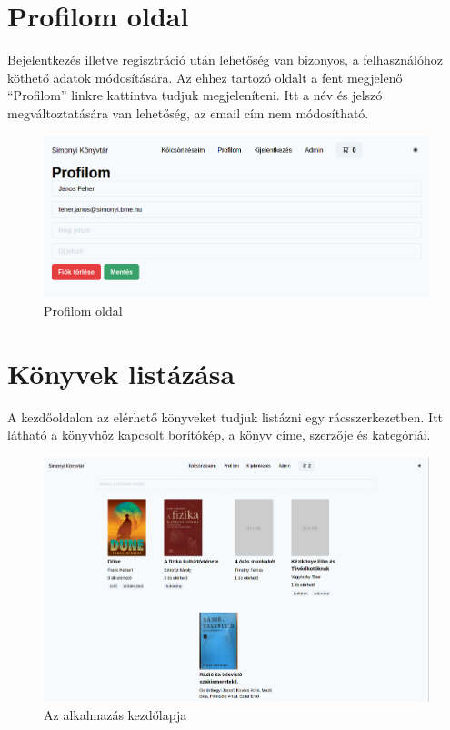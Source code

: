 \section{Profilom oldal}

Bejelentkezés illetve regisztráció után lehetőség van bizonyos, a felhasználóhoz köthető adatok módosítására. Az ehhez tartozó oldalt a fent megjelenő ``Profilom''
linkre kattintva tudjuk megjeleníteni. Itt a név és jelszó megváltoztatására van lehetőség, az email cím nem módosítható.

\begin{figure}[!ht]
  \centering
  \includegraphics[width=150mm, keepaspectratio]{figures/profile-page.png}
  \caption{Profilom oldal}
  \label{fig:ProfilePage}
\end{figure}

\section{Könyvek listázása}

A kezdőoldalon az elérhető könyveket tudjuk listázni egy rácsszerkezetben.
Itt látható a könyvhöz kapcsolt borítókép, a könyv címe, szerzője és kategóriái.

\begin{figure}[!ht]
  \centering
  \includegraphics[width=150mm, keepaspectratio]{figures/index.png}
  \caption{Az alkalmazás kezdőlapja}
  \label{fig:IndexPage}
\end{figure}


